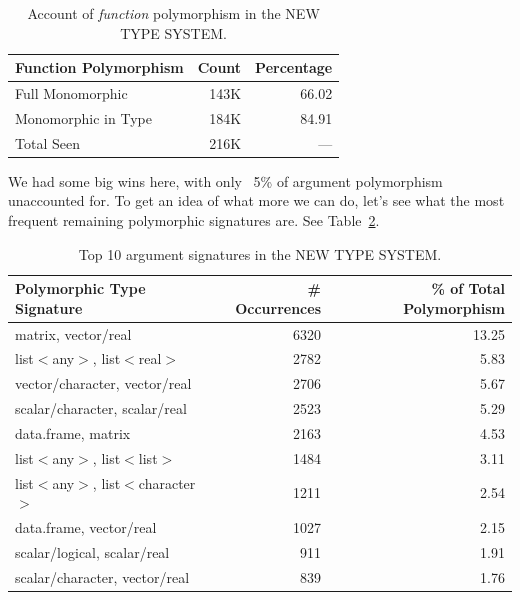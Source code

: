 \documentclass[acmsmall,10pt,review,anonymous]{acmart}\settopmatter{printfolios=true,printccs=false,printacmref=false}
\begin{document}
\begin{table}[ht]
\label{tab:funcountsWHATTS}
\centering
\begin{tabular}{lrr}
  \hline
 Function Polymorphism & Count & Percentage \\ 
  \hline
  Full Monomorphic & 143K & 66.02 \\ 
  Monomorphic in Type & 184K & 84.91 \\
  Total Seen & 216K & --- \\ 
   \hline
\end{tabular}
\caption{Account of {\it function} polymorphism in the NEW TYPE SYSTEM.}
\end{table}

We had some big wins here, with only ~5\% of argument polymorphism unaccounted for.
To get an idea of what more we can do, let's see what the most frequent remaining polymorphic signatures are.
See Table~\ref{tab:toppolyWHATTS}.

\begin{table}[ht]
\label{tab:toppolyWHATTS}
\centering
\begin{tabular}{lrr}
  \hline
Polymorphic Type Signature & \# Occurrences & \% of Total Polymorphism \\ 
  \hline
  matrix, vector/real & 6320 & 13.25 \\ 
  list$<$any$>$, list$<$real$>$ & 2782 & 5.83 \\ 
  vector/character, vector/real & 2706 & 5.67 \\ 
  scalar/character, scalar/real & 2523 & 5.29 \\ 
  data.frame, matrix & 2163 & 4.53 \\ 
  list$<$any$>$, list$<$list$>$ & 1484 & 3.11 \\ 
  list$<$any$>$, list$<$character$>$ & 1211 & 2.54 \\ 
  data.frame, vector/real & 1027 & 2.15 \\ 
  scalar/logical, scalar/real & 911 & 1.91 \\ 
  scalar/character, vector/real & 839 & 1.76 \\ 
   \hline
\end{tabular}
\caption{Top 10 argument signatures in the NEW TYPE SYSTEM.}
\end{table}
\end{document}

